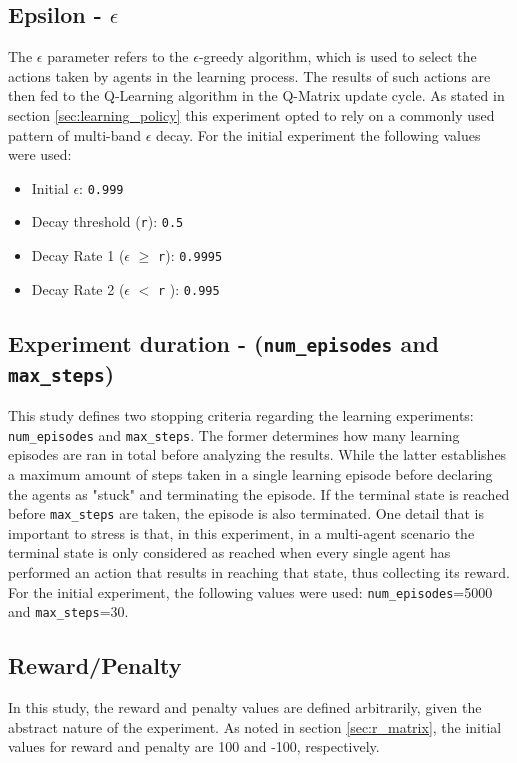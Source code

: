 \documentclass[11pt]{article}
\begin{document}
    \subsection{Epsilon - $\epsilon$}
        The $\epsilon$ parameter refers to the $\epsilon$-greedy algorithm, which is used to select the actions taken by agents in the learning process. The results of such actions are then fed to the Q-Learning algorithm in the Q-Matrix update cycle. As stated in section \ref{sec:learning_policy} this experiment opted to rely on a commonly used pattern of multi-band $\epsilon$ decay. For the initial experiment the following values were used:
        \begin{itemize}
            \item Initial $\epsilon$: \texttt{0.999}
            \item Decay threshold (\texttt{r}): \texttt{0.5}
            \item Decay Rate 1 ($\epsilon$ $\geqslant$ \texttt{r}): \texttt{0.9995}
            \item Decay Rate 2 ($\epsilon$ $<$ \texttt{r} ): \texttt{0.995}
        \end{itemize}

    \subsection{Experiment duration - (\texttt{num\_episodes} and \texttt{max\_steps})}\label{sec:params:duration}
        \sloppy This study defines two stopping criteria regarding the learning experiments: \texttt{num\_episodes} and \texttt{max\_steps}. The former determines how many learning episodes are ran in total before analyzing the results. While the latter establishes a maximum amount of steps taken in a single learning episode before declaring the agents as "stuck" and terminating the episode. If the terminal state is reached before \texttt{max\_steps} are taken, the episode is also terminated. One detail that is important to stress is that, in this experiment, in a multi-agent scenario the terminal state is only considered as reached when every single agent has performed an action that results in reaching that state, thus collecting its reward. For the initial experiment, the following values were used: \texttt{num\_episodes}=5000 and \texttt{max\_steps}=30.

    \subsection{Reward/Penalty}
        In this study, the reward and penalty values are defined arbitrarily, given the abstract nature of the experiment. As noted in section \ref{sec:r_matrix}, the initial values for reward and penalty are 100 and -100, respectively.
\end{document}
